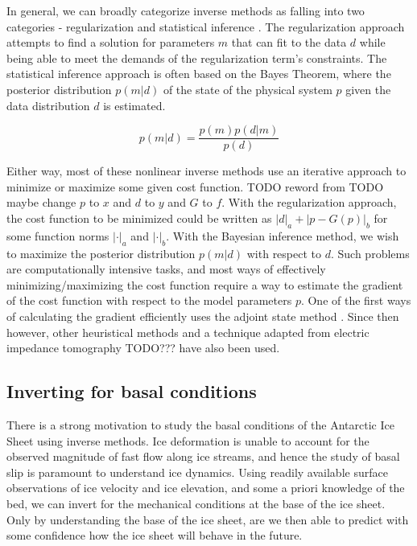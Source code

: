 In general, we can broadly categorize inverse methods as falling into two categories - regularization and statistical inference \citep[see][for a review]{GudmundssonInverseMethodsGlaciology2011}.
The regularization approach attempts to find a solution for parameters $m$ that can fit to the data $d$ while being able to meet the demands of the regularization term's constraints.
The statistical inference approach is often based on the Bayes Theorem, where the posterior distribution $p(m|d)$ of the state of the physical system $p$ given the data distribution $d$ is estimated.

\begin{equation}
  p(m|d) = \frac{p(m)p(d|m)}{p(d)}
\end{equation}

Either way, most of these nonlinear inverse methods use an iterative approach to minimize or maximize some given cost function.
TODO reword from \citep{GudmundssonInverseMethodsGlaciology2011}
TODO maybe change $p$ to $x$ and $d$ to $y$ and $G$ to $f$.
With the regularization approach, the cost function to be minimized could be written as $|d|_a + |p - G(p)|_b$ for some function norms $|\cdot|_a$ and $|\cdot|_b$.
With the Bayesian inference method, we wish to maximize the posterior distribution $p(m|d)$ with respect to $d$.
Such problems are computationally intensive tasks, and most ways of effectively minimizing/maximizing the cost function require a way to estimate the gradient of the cost function with respect to the model parameters $p$.
One of the first ways of calculating the gradient efficiently uses the adjoint state method \citep{MacAyealtutorialusecontrol1993}.
Since then however, other heuristical methods \citep{Pollardsimpleinversemethod2012} and a technique adapted from electric impedance tomography TODO??? \citep{ArthernFlowspeedAntarctic2015} have also been used.

\subsection{Inverting for basal conditions}

There is a strong motivation to study the basal conditions of the Antarctic Ice Sheet using inverse methods.
Ice deformation is unable to account for the observed magnitude of fast flow along ice streams, and hence the study of basal slip is paramount to understand ice dynamics.
Using readily available surface observations of ice velocity and ice elevation, and some a priori knowledge of the bed, we can invert for the mechanical conditions at the base of the ice sheet.
Only by understanding the base of the ice sheet, are we then able to predict with some confidence how the ice sheet will behave in the future.

